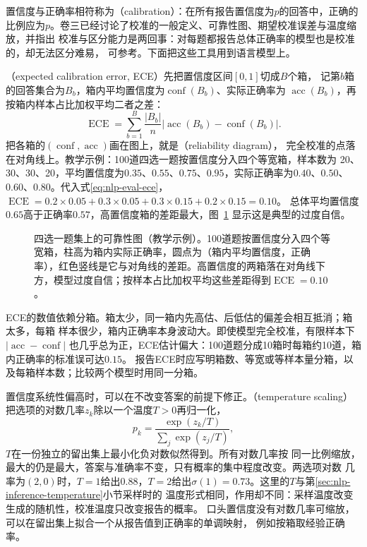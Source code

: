 置信度与正确率相符称为（calibration）：在所有报告置信度为$p$的回答中，正确的
比例应为$p$。卷三已经讨论了校准的一般定义、可靠性图、期望校准误差与温度缩放，并指出
校准与区分能力是两回事：对每题都报告总体正确率的模型也是校准的，却无法区分难易，
可参考。下面把这些工具用到语言模型上。

（expected calibration error, ECE）先把置信度区间$[0,1]$切成$B$个箱，
记第$b$箱的回答集合为$B_b$，箱内平均置信度为$\operatorname{conf}(B_b)$、实际正确率为
$\operatorname{acc}(B_b)$，再按箱内样本占比加权平均二者之差：
\begin{equation}
 \operatorname{ECE}=\sum_{b=1}^{B}\frac{|B_b|}{n}
 \bigl|\operatorname{acc}(B_b)-\operatorname{conf}(B_b)\bigr|.
 \label{eq:nlp-eval-ece}
\end{equation}
把各箱的$(\operatorname{conf},\operatorname{acc})$画在图上，就是（reliability diagram），
完全校准的点落在对角线上。教学示例：100道四选一题按置信度分入四个等宽箱，样本数为
20、30、30、20，平均置信度为$0.35$、$0.55$、$0.75$、$0.95$，实际正确率为$0.40$、$0.50$、
$0.60$、$0.80$。代入式\eqref{eq:nlp-eval-ece}，
$\operatorname{ECE}=0.2\times0.05+0.3\times0.05+0.3\times0.15+0.2\times0.15=0.10$。
总体平均置信度$0.65$高于正确率$0.57$，高置信度箱的差距最大，图~\ref{fig:nlp-eval-reliability}
显示这是典型的过度自信。

\begin{figure}[htbp]
  \centering
  
  \caption{四选一题集上的可靠性图（教学示例）。100道题按置信度分入四个等宽箱，柱高为箱内实际正确率，圆点为（箱内平均置信度，正确率），红色竖线是它与对角线的差距。高置信度的两箱落在对角线下方，模型过度自信；按样本占比加权平均这些差距得到$\operatorname{ECE}=0.10$。}
  \label{fig:nlp-eval-reliability}
\end{figure}

ECE的数值依赖分箱。箱太少，同一箱内先高估、后低估的偏差会相互抵消；箱太多，每箱
样本很少，箱内正确率本身波动大。即使模型完全校准，有限样本下$|\operatorname{acc}-\operatorname{conf}|$
也几乎总为正，ECE估计偏大：100道题分成10箱时每箱约10道，箱内正确率的标准误可达$0.15$。
报告ECE时应写明箱数、等宽或等样本量分箱，以及每箱样本数；比较两个模型时用同一分箱。

置信度系统性偏高时，可以在不改变答案的前提下修正。（temperature scaling）
把选项的对数几率$z_k$除以一个温度$T>0$再归一化，
\begin{equation}
 p_k=\frac{\exp(z_k/T)}{\sum_{j}\exp(z_j/T)},
 \label{eq:nlp-eval-temperature-scaling}
\end{equation}
$T$在一份独立的留出集上最小化负对数似然得到。所有对数几率按
同一比例缩放，最大的仍是最大，答案与准确率不变，只有概率的集中程度改变。两选项对数
几率为$(2,0)$时，$T=1$给出$0.88$，$T=2$给出$\sigma(1)=0.73$。这里的$T$与第\ref{sec:nlp-inference-temperature}小节采样时的
温度形式相同，作用却不同：采样温度改变生成的随机性，校准温度只改变报告的概率。
口头置信度没有对数几率可缩放，可以在留出集上拟合一个从报告值到正确率的单调映射，
例如按箱取经验正确率。

